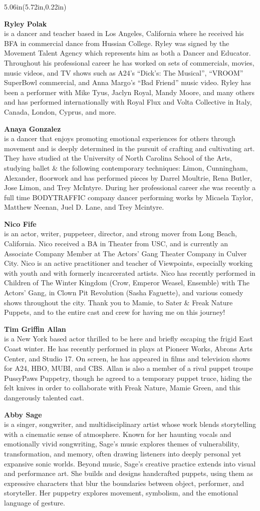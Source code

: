 \documentclass[10pt,letterpaper,landscape]{article}
\newenvironment{acpanel}[2]{%
  \begin{textblock*}{5.06in}(#1,#2)%
    \begin{minipage}[t][8.06in][t]{5.06in}%
      \raggedright%
}{%
    \end{minipage}%
  \end{textblock*}%
}
\newcommand{\biochip}[2]{%
\begingroup
\setlength{\fboxsep}{1.5pt}%
\noindent\colorbox{black!4}{%
\parbox{\dimexpr\linewidth-2\fboxsep\relax}{%
{\fontsize{6.2}{6.8}\selectfont\textbf{#1}}\\[-0.14em]
{\fontsize{5.1}{5.75}\selectfont #2}
}}\vspace{0.038in}
\endgroup
}
\newcommand{\biomini}[2]{\biochip{#1}{#2}}
\begin{document}
\begin{acpanel}{5.72in}{0.22in}
\biomini{Ryley Polak}{is a dancer and teacher based in Los Angeles, California where he received his BFA in commercial dance from Hussian College. Ryley was signed by the Movement Talent Agency which represents him as both a Dancer and Educator. Throughout his professional career he has worked on sets of commercials, movies, music videos, and TV shows such as A24's ``Dick's: The Musical'', ``VROOM'' SuperBowl commercial, and Anna Margo's ``Bad Friend'' music video. Ryley has been a performer with Mike Tyus, Jaclyn Royal, Mandy Moore, and many others and has performed internationally with Royal Flux and Volta Collective in Italy, Canada, London, Cyprus, and more.}
\biomini{Anaya Gonzalez}{is a dancer that enjoys promoting emotional experiences for others through movement and is deeply determined in the pursuit of crafting and cultivating art. They have studied at the University of North Carolina School of the Arts, studying ballet \& the following contemporary techniques: Limon, Cunningham, Alexander, floorwork and has performed pieces by Darrel Moultrie, Rena Butler, Jose Limon, and Trey McIntyre. During her professional career she was recently a full time BODYTRAFFIC company dancer performing works by Micaela Taylor, Matthew Neenan, Juel D. Lane, and Trey Mcintyre.}
\biomini{Nico Fife}{is an actor, writer, puppeteer, director, and strong mover from Long Beach, California. Nico received a BA in Theater from USC, and is currently an Associate Company Member at The Actors' Gang Theater Company in Culver City. Nico is an active practitioner and teacher of Viewpoints, especially working with youth and with formerly incarcerated artists. Nico has recently performed in Children of The Winter Kingdom (Crow, Emperor Weasel, Ensemble) with The Actors' Gang, in Clown Pit Revolution (Sasha Faguette), and various comedy shows throughout the city. Thank you to Mamie, to Sater \& Freak Nature Puppets, and to the entire cast and crew for having me on this journey!}
\biomini{Tim Griffin Allan}{is a New York based actor thrilled to be here and briefly escaping the frigid East Coast winter. He has recently performed in plays at Pioneer Works, Abrons Arts Center, and Studio 17. On screen, he has appeared in films and television shows for A24, HBO, MUBI, and CBS. Allan is also a member of a rival puppet troupe PussyPaws Puppetry, though he agreed to a temporary puppet truce, hiding the felt knives in order to collaborate with Freak Nature, Mamie Green, and this dangerously talented cast.}
\biomini{Abby Sage}{is a singer, songwriter, and multidisciplinary artist whose work blends storytelling with a cinematic sense of atmosphere. Known for her haunting vocals and emotionally vivid songwriting, Sage's music explores themes of vulnerability, transformation, and memory, often drawing listeners into deeply personal yet expansive sonic worlds. Beyond music, Sage's creative practice extends into visual and performance art. She builds and designs handcrafted puppets, using them as expressive characters that blur the boundaries between object, performer, and storyteller. Her puppetry explores movement, symbolism, and the emotional language of gesture.}

\end{acpanel}
\end{document}
